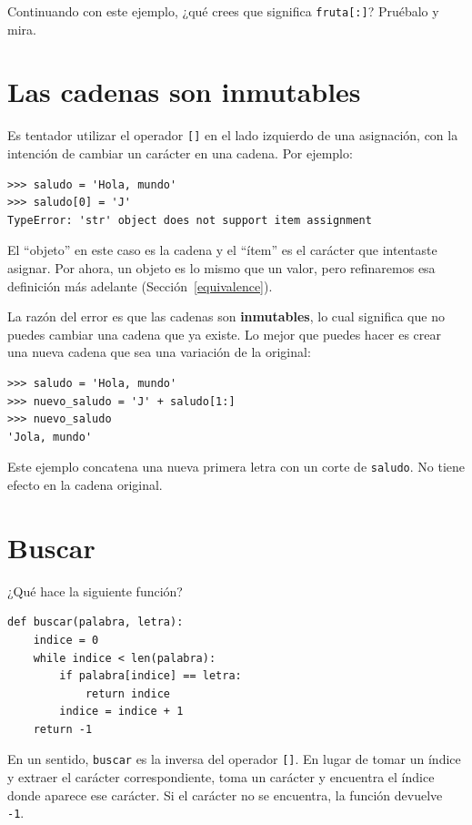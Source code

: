 \documentclass[10pt]{book}
\begin{document}
Continuando con este ejemplo, ¿qué crees que significa
{\tt fruta[:]}?  Pruébalo y mira.



\section{Las cadenas son inmutables}

Es tentador utilizar el operador {\tt []} en el lado izquierdo de una
asignación, con la intención de cambiar un carácter en una cadena.
Por ejemplo:

\begin{verbatim}
>>> saludo = 'Hola, mundo'
>>> saludo[0] = 'J'
TypeError: 'str' object does not support item assignment
\end{verbatim}
%
El ``objeto'' en este caso es la cadena y el ``ítem'' es
el carácter que intentaste asignar.  Por ahora, un objeto es
lo mismo que un valor, pero refinaremos esa definición
más adelante (Sección~\ref{equivalence}).

La razón del error es que
las cadenas son {\bf inmutables}, lo cual significa que no puedes cambiar una
cadena que ya existe.  Lo mejor que puedes hacer es crear una nueva cadena
que sea una variación de la original:

\begin{verbatim}
>>> saludo = 'Hola, mundo'
>>> nuevo_saludo = 'J' + saludo[1:]
>>> nuevo_saludo
'Jola, mundo'
\end{verbatim}
%
Este ejemplo concatena una nueva primera letra con
un corte de {\tt saludo}.  No tiene efecto en
la cadena original.


\section{Buscar}
\label{find}

¿Qué hace la siguiente función?

\begin{verbatim}
def buscar(palabra, letra):
    indice = 0
    while indice < len(palabra):
        if palabra[indice] == letra:
            return indice
        indice = indice + 1
    return -1
\end{verbatim}
%
En un sentido, {\tt buscar} es la inversa del operador {\tt []}.
En lugar de tomar un índice y extraer el carácter correspondiente,
toma un carácter y encuentra el índice donde aparece ese
carácter.  Si el carácter no se encuentra, la función devuelve {\tt
-1}.
\end{document}
